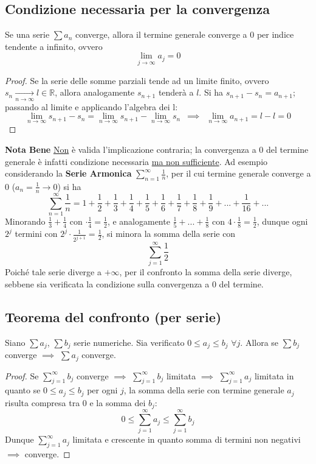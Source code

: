 \documentclass[10pt, oneside]{book}
\theoremstyle{plain}
\begin{document}
\subsection{Condizione necessaria per la convergenza}
\begin{prop}
Se una serie $\sum a_n$ converge, allora il termine generale converge a 0 per indice tendente a infinito, ovvero
\[\lim \limits_{j \rightarrow \infty} a_j = 0\]
\end{prop}
\begin{proof}
Se la serie delle somme parziali tende ad un limite finito, ovvero $s_n \xrightarrow[n \rightarrow \infty]{} l \in \mathbb{R}$, allora analogamente $s_{n + 1}$ tenderà a $l$. Si ha $s_{n+1} - s_n = a_{n + 1}$; passando al limite e applicando l'algebra dei l:
\[\lim \limits_{n \rightarrow \infty} s_{n+1} - s_n = \lim \limits_{n \rightarrow \infty} s_{n+1} - \lim \limits_{n \rightarrow \infty} s_{n} \enspace \implies \enspace \lim \limits_{n \rightarrow \infty} a_{n+1} = l - l = 0\]
\end{proof}
\textbf{Nota Bene} \underline{Non} è valida l'implicazione contraria; la convergenza a 0 del termine generale è infatti condizione necessaria \underline{ma non sufficiente}. Ad esempio considerando la \textbf{Serie Armonica} $\sum_{n=1}^{\infty} \frac{1}{n}$, per il cui termine generale converge a 0 ($a_n = \frac{1}{n} \rightarrow 0$) si ha
\[\sum_{n=1}^{\infty} \frac{1}{n} = 1 + \frac{1}{2} + \frac{1}{3} + \frac{1}{4} + \frac{1}{5} + \frac{1}{6} + \frac{1}{7} + \frac{1}{8} + \frac{1}{9} + ... + \frac{1}{16} + ...\]
Minorando $\displaystyle \frac{1}{3} + \frac{1}{4}$ con $\displaystyle  \cdot \frac{1}{4} = \frac{1}{2}$, e analogamente $\displaystyle \frac{1}{5} + ... + \frac{1}{8}$ con $\displaystyle 4 \cdot \frac{1}{8} = \frac{1}{2}$, dunque ogni $2^j$ termini con $\displaystyle 2^j \cdot \frac{1}{2^{j+1}} = \frac{1}{2}$, si minora la somma della serie con 
\[\sum \limits_{j = 1}^{\infty} \frac{1}{2}\]
Poiché tale serie diverge a $+ \infty$, per il confronto la somma della serie diverge, sebbene sia verificata la condizione sulla convergenza a $0$ del termine.

\subsection{Teorema del confronto (per serie)}
\begin{ther}
Siano $\sum a_j$, $\sum b_j$ serie numeriche. Sia verificato $0 \leq a_j \leq b_j$ $\forall j$. Allora se $\sum b_j$ converge $\implies$ $\sum a_j$ converge.
\end{ther}
\begin{proof}
Se $\sum_{j=1}^{\infty} b_j$ converge $\implies$ $\sum_{j=1}^{\infty} b_j$ limitata $\implies$ $\sum_{j=1}^{\infty} a_j$ limitata in quanto se $0 \leq a_j \leq b_j$ per ogni $j$, la somma della serie con termine generale $a_j$ risulta compresa tra 0 e la somma dei $b_j$:
\[0 \leq \sum_{j=1}^{\infty} a_j \leq \sum_{j=1}^{\infty} b_j\]
Dunque $\sum_{j=1}^{\infty} a_j$ limitata e crescente in quanto somma di termini non negativi $\implies$ converge.
\end{proof}
\newpage
\end{document}
